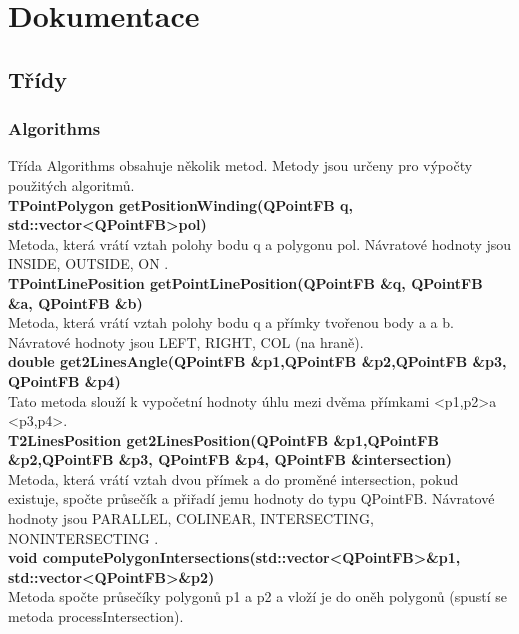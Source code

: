 \documentclass[a4paper, 12pt]{article}
\begin{document}
\clearpage



\section{Dokumentace}
\subsection{Třídy}
\subsubsection{Algorithms}
Třída Algorithms obsahuje několik metod. Metody jsou určeny pro výpočty použitých algoritmů.
\\

\textbf{TPointPolygon getPositionWinding(QPointFB q, std::vector\textless QPointFB\textgreater pol)}\\
Metoda, která vrátí vztah polohy bodu q a polygonu pol. Návratové hodnoty jsou INSIDE, OUTSIDE, ON .\\

\textbf{TPointLinePosition getPointLinePosition(QPointFB \&q, QPointFB \&a, QPointFB \&b)}\\
Metoda, která vrátí vztah polohy bodu q a přímky tvořenou body a a b. Návratové hodnoty jsou LEFT, RIGHT, COL (na hraně).\\

\textbf{double get2LinesAngle(QPointFB \&p1,QPointFB \&p2,QPointFB \&p3, QPointFB \&p4)}\\
Tato metoda slouží k vypočetní hodnoty úhlu mezi dvěma přímkami \textless p1,p2\textgreater a \textless p3,p4\textgreater .\\

\textbf{T2LinesPosition get2LinesPosition(QPointFB \&p1,QPointFB \&p2,QPointFB \&p3, QPointFB \&p4, QPointFB \&intersection)}\\
Metoda, která vrátí vztah dvou přímek a do proměné intersection, pokud existuje, spočte průsečík a přiřadí jemu hodnoty do typu QPointFB. Návratové hodnoty jsou PARALLEL, COLINEAR, INTERSECTING, NONINTERSECTING .\\


\textbf{void computePolygonIntersections(std::vector\textless QPointFB\textgreater \&p1, \\
std::vector\textless QPointFB\textgreater \&p2)}\\
Metoda spočte průsečíky polygonů p1 a p2 a vloží je do oněh polygonů (spustí se metoda processIntersection).\\
\end{document}
